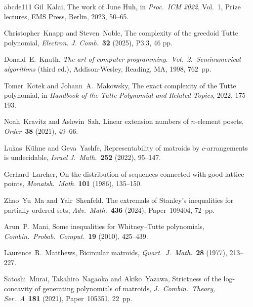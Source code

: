 \documentclass[11pt]{amsart}
\theoremstyle{definition}
\numberwithin{figure}{section}
\numberwithin{equation}{section}
\begin{document}
{\begin{thebibliography}{abcde111}
Gil~Kalai, The work of June Huh,
in \emph{Proc.\ ICM 2022}, Vol.~1, Prize lectures,
EMS Press, Berlin, 2023, 50--65.

Christopher~Knapp and Steven~Noble,
The complexity of the greedoid Tutte polynomial,
\emph{Electron. J. Comb.}~\textbf{32} (2025), P3.3, 46 pp.


Donald~E.~Knuth,
\emph{The art of computer programming.\ Vol.~2.\ Seminumerical algorithms}
(third ed.), Addison-Wesley, Reading, MA, 1998, 762~pp.

Tomer~Kotek and Johann~A.~Makowsky,
The exact complexity of the Tutte polynomial, in
\emph{Handbook of the Tutte Polynomial and Related Topics},
2022, 175--193.



Noah~Kravitz and Ashwin~Sah, Linear extension numbers of $n$-element posets,
\emph{Order}~\textbf{38} (2021), 49--66.

Lukas~K\"uhne and Geva~Yashfe, Representability of matroids by $c$-arrangements
is undecidable, \emph{Israel J.\ Math.}~\textbf{252} (2022), 95--147.

Gerhard~Larcher,
On the distribution of sequences connected with good lattice points,
\emph{Monatsh.\ Math.} \textbf{101} (1986), 135--150.

Zhao~Yu~Ma and Yair~Shenfeld,
The extremals of Stanley's inequalities for partially ordered sets,
\emph{Adv.\ Math.}~\textbf{436} (2024), Paper~109404, 72~pp.

Arun~P.~Mani,
Some inequalities for Whitney--Tutte polynomials,
\emph{Combin.\ Probab.\ Comput.}~\textbf{19} (2010), 425--439.

Laurence~R.~Matthews, Bicircular matroids,
\emph{Quart.\ J.\ Math.}~\textbf{28} (1977), 213--227.

Satoshi~Murai, Takahiro~Nagaoka and  Akiko~Yazawa,
Strictness of the log-concavity of generating polynomials of matroids,
\emph{J.\ Combin.\ Theory, Ser.~A}~\textbf{181} (2021),  Paper~105351, 22~pp.



%



\end{thebibliography}}
\end{document}
